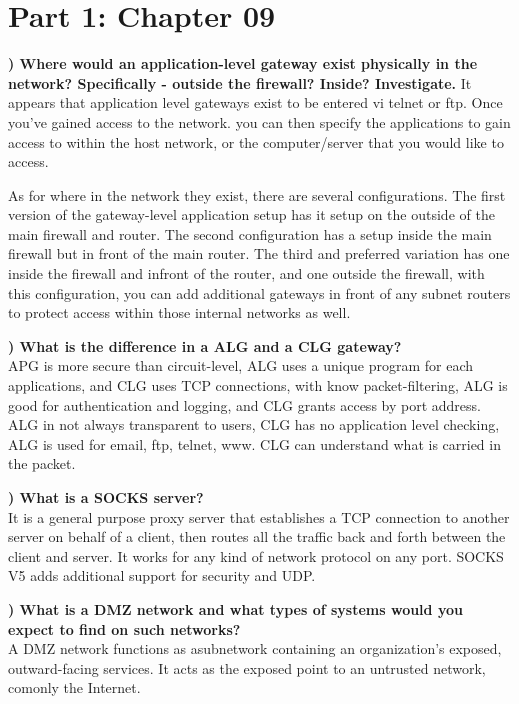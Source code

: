 \documentclass{report}
\title{\classinfo}
\author{\semester}
\date{\today}
\newcommand{\mysection}[1]{\section*{#1}}
\newcommand{\mysubsection}[2]{\textbf{\romannumeral #1) #2}}
\begin{document}
\maketitle


\mysection{\textbf{Part 1: Chapter 09 }}


\mysubsection{1}{Where would an application-level gateway exist physically in the network?  Specifically - outside the firewall?  Inside?  Investigate.}
It appears that application level gateways exist to be entered vi telnet or
ftp. Once you've gained access to the network. you can then specify the
applications to gain access to within the host network, or the computer/server
that you would like to access.

As for where in the network they exist, there are several configurations. The
first version of the gateway-level application setup has it setup on the
outside of the main firewall and router. The second configuration has a setup
inside the main firewall but in front of the main router. The third and
preferred variation has one inside the firewall and infront of the router, and
one outside the firewall, with this configuration, you can add additional
gateways in front of any subnet routers to protect access within those internal
networks as well. 


\noindent\mysubsection{2}{What is the difference in a ALG and a CLG gateway?  }
\\APG is more secure than circuit-level, ALG uses a unique program for each
applications, and CLG uses TCP connections, with know packet-filtering, ALG is
good for authentication and logging, and CLG grants access by port address. ALG
in not always transparent to users, CLG has no application level checking, ALG
is used for email, ftp, telnet, www. CLG can understand what is carried in the
packet.


\noindent\mysubsection{3}{What is a SOCKS server?  }
\\It is a general purpose proxy server that establishes a TCP connection to
another server on behalf of a client, then routes all the traffic back and
forth between the client and server. It works for any kind of network protocol
on any port. SOCKS V5 adds additional support for security and UDP.


\noindent\mysubsection{4}{What is a DMZ network and what types of systems would you expect to find on such networks?}
\\A DMZ network functions as  asubnetwork containing an organization's exposed,
outward-facing services. It acts as the exposed point to an untrusted network,
comonly the Internet.
\end{document}
